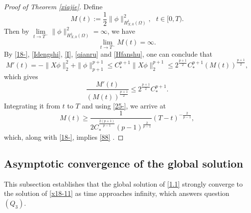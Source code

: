 \documentclass[11pt,a4paper]{article}
\numberwithin{equation}{section}
\numberwithin{remark}{section}
\begin{document}
\begin{proof}[Proof of Theorem \ref{xiajie}]
Define
\begin{equation}\label{18-}
M(t):=\frac{1}{2}\|\phi\|_{H_{X,0}^1(\Omega)}^2,\ \ \ t\in[0,T).
\end{equation}
Then by $\lim\limits_{t\rightarrow T^-}\|\phi\|_{H_{X,0}^1(\Omega)}^2=\infty$, we have
\begin{equation}\label{25-}
\lim_{t\rightarrow T^-}M(t)=\infty.
\end{equation}
By \eqref{18-}, \eqref{Idengshi}, \eqref{I}, \eqref{qianru} and \eqref{Hfanshu}, one can conclude that
\begin{equation}\label{26}
M'(t)=-\|X\phi\|_2^2+\|\phi\|_{p+1}^{p+1}\leq C_*^{p+1}\|X\phi\|_2^{p+1}\leq 2^{\frac{p+1}{2}}C_*^{p+1}(M(t))^{\frac{p+1}{2}},
\end{equation}
which gives
\begin{equation*}
\frac{M'(t)}{(M(t))^{\frac{p+1}{2}}}\leq2^{\frac{p+1}{2}}C_*^{p+1}.
\end{equation*}
Integrating it from $t$ to $T$ and using \eqref{25-}, we arrive at
\begin{equation*}
M(t)\geq\frac{1}{2C_*^{\frac{2(p+1)}{p-1}}(p-1)^{\frac{2}{p-1}}}(T-t)^{-\frac{2}{p-1}},
\end{equation*}
which, along with \eqref{18-}, implies \eqref{88} .
\end{proof}



\subsection{Asymptotic convergence of the global solution}
\quad\quad
This subsection establishes that the global solution of \eqref{1.1} strongly converge to the solution of \eqref{x18-11} as time approaches infinity, which answers question $(Q_3)$.
\end{document}
